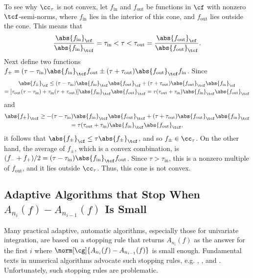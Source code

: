 \documentclass[]{elsarticle}
\theoremstyle{definition}
\theoremstyle{remark}
\newcommand{\Fnorm}[1]{\abs{#1}_{\cf}}
\newcommand{\Ftnorm}[1]{\abs{#1}_{\tcf}}
\begin{document}
To see why $\cc_{\tau}$ is not convex, let $f_{\text{in}}$ and $f_{\text{out}}$ be functions in $\cf$ with nonzero $\tcf$-semi-norms, where $f_{\text{in}}$  lies in the interior of this cone, and $f_{\text{out}}$ lies outside the cone.  This means that 
\[
\frac{\Fnorm{f_{\text{in}}}} {\Ftnorm{f_{\text{in}}}} = \tau_{\text{in}} < \tau < \tau_{\text{out}} =  \frac{\Fnorm{f_{\text{out}}}} {\Ftnorm{f_{\text{out}}}}.
\]
Next define two functions $f_{\pm} = (\tau-\tau_{\text{in}}) \Ftnorm{f_{\text{in}}} f_{\text{out}}  \pm (\tau + \tau_{\text{out}}) \Ftnorm{f_{\text{out}}} f_{\text{in}}$.
Since 
\begin{multline*} 
\Fnorm{f_{\pm}} \le (\tau-\tau_{\text{in}}) \Ftnorm{f_{\text{in}}} \Fnorm{f_{\text{out}}}  + (\tau + \tau_{\text{out}}) \Ftnorm{f_{\text{out}}} \Fnorm{f_{\text{in}}}\\
= [\tau_{\text{out}} (\tau-\tau_{\text{in}})  + \tau_{\text{in}} (\tau + \tau_{\text{out}})] \Ftnorm{f_{\text{in}}} \Ftnorm{f_{\text{out}}} =  \tau (\tau_{\text{out}} +\tau_{\text{in}}) \Ftnorm{f_{\text{in}}} \Ftnorm{f_{\text{out}}}
\end{multline*}
and 
\begin{multline*} 
\Ftnorm{f_{\pm}} \ge -(\tau-\tau_{\text{in}}) \Ftnorm{f_{\text{in}}} \Ftnorm{f_{\text{out}}}  + (\tau + \tau_{\text{out}}) \Ftnorm{f_{\text{out}}} \Ftnorm{f_{\text{in}}}\\
 =  \tau (\tau_{\text{out}} +\tau_{\text{in}}) \Ftnorm{f_{\text{in}}} \Ftnorm{f_{\text{out}}},
\end{multline*}
it follows that $\Fnorm{f_{\pm}} \le \tau \Ftnorm{f_{\pm}}$, and so $f_{\pm} \in \cc_{\tau}$.  On the other hand, the average of $f_{\pm}$, which is a convex combination, is $(f_- + f_+)/2 = (\tau-\tau_{\text{in}}) \Ftnorm{f_{\text{in}}} f_{\text{out}}$.  Since $\tau > \tau_{\text{in}}$, this is a nonzero multiple of $f_{\text{out}}$, and it lies outside $\cc_{\tau}$.  Thus, this cone is not convex.

\subsection{Adaptive Algorithms that Stop When $A_{n_{i}}(f)-A_{n_{i-1}}(f)$ Is Small} \label{Lynesssubsec}

Many practical adaptive, automatic algorithms, especially those for univariate integration, are based on a stopping rule that returns $A_{n_{i}}(f)$ as the answer for the first $i$ where $\norm[\cg]{A_{n_{i}}(f)-A_{n_{i-1}}(f)}$ is small enough.  Fundamental texts in numerical algorithms advocate such stopping rules, e.g. \cite[p.\ 223--224]{BurFai10}, \cite[p.\ 233]{CheKin12a}, and \cite[p.\ 270]{Sau12a}.  Unfortunately, such stopping rules are problematic.
\end{document}
